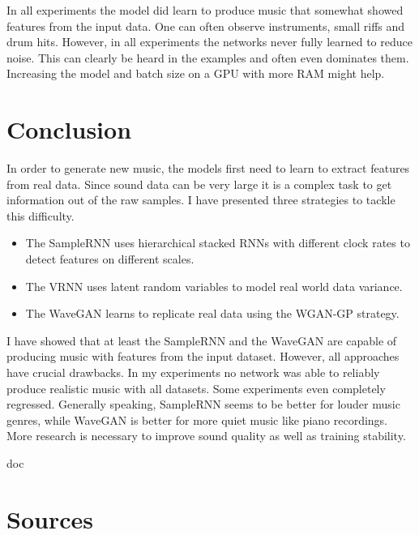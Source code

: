 \documentclass[12pt]{article}
\begin{document}
In all experiments the model did learn to produce music that somewhat showed features from the input data.
One can often observe instruments, small riffs and drum hits.
However, in all experiments the networks never fully learned to reduce noise.
This can clearly be heard in the examples and often even dominates them.
Increasing the model and batch size on a GPU with more RAM might help.



\section{Conclusion}
In order to generate new music, the models first need to learn to extract features from real data.
Since sound data can be very large it is a complex task to get information out of the raw samples.
I have presented three strategies to tackle this difficulty.
\begin{itemize}
 \item The SampleRNN uses hierarchical stacked RNNs with different clock rates to detect features on different scales.
 \item The VRNN uses latent random variables to model real world data variance.
 \item The WaveGAN learns to replicate real data using the WGAN-GP strategy.
\end{itemize}

I have showed that at least the SampleRNN and the WaveGAN are capable of producing music with features from the input dataset.
However, all approaches have crucial drawbacks.
In my experiments no network was able to reliably produce realistic music with all datasets.
Some experiments even completely regressed.
Generally speaking, SampleRNN seems to be better for louder music genres, while WaveGAN is better for more quiet music like piano recordings.
More research is necessary to improve sound quality as well as training stability.




\newpage
\begin{btSect}{doc} %
\section*{Sources}
\btPrintCited
\end{btSect}
\end{document}
